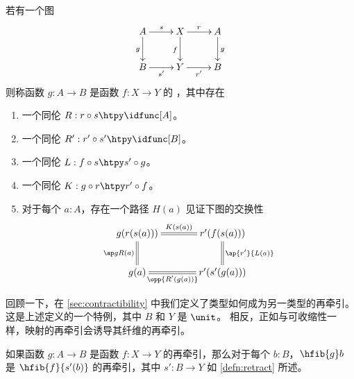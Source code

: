 \begin{defn}\label{defn:retract}
若有一个图
\begin{equation*}
  \xymatrix{
      {A} \ar[r]^{s} \ar[d]_{g}
    &
      {X} \ar[r]^{r} \ar[d]_{f}
    &
      {A} \ar[d]^{g}
    \\
    {B} \ar[r]_{s'}
    &
      {Y} \ar[r]_{r'}
    &
      {B}
  }
\end{equation*}
则称函数 $g:A\to B$ 是函数 $f:X\to Y$ 的 ，其中存在
\begin{enumerate}
  \item 一个同伦 $R:r\circ s \htpy \idfunc[A]$。
  \item 一个同伦 $R':r'\circ s' \htpy\idfunc[B]$。
  \item 一个同伦 $L:f\circ s\htpy s'\circ g$。
  \item 一个同伦 $K:g\circ r\htpy r'\circ f$。
  \item 对于每个 $a:A$，存在一个路径 $H(a)$ 见证下图的交换性
  \begin{equation*}
    \xymatrix@C=3pc{
        {g(r(s(a)))} \ar@{=}[r]^-{K(s(a))} \ar@{=}[d]_{\ap g{R(a)}}
      &
        {r'(f(s(a)))} \ar@{=}[d]^{\ap{r'}{L(a)}}
      \\
      {g(a)} \ar@{=}[r]_-{\opp{R'(g(a))}}
      &
        {r'(s'(g(a)))}
    }
  \end{equation*}
\end{enumerate}
\end{defn}

回顾一下，在 \cref{sec:contractibility} 中我们定义了类型如何成为另一类型的再牵引。
这是上述定义的一个特例，其中 $B$ 和 $Y$ 是 $\unit$。
相反，正如与可收缩性一样，映射的再牵引会诱导其纤维的再牵引。

\begin{lem}\label{lem:func_retract_to_fiber_retract}
如果函数 $g:A\to B$ 是函数 $f:X\to Y$ 的再牵引，那么对于每个 $b:B$，$\hfib{g}b$ 是 $\hfib{f}{s'(b)}$ 的再牵引，其中 $s':B\to Y$ 如 \cref{defn:retract} 所述。
\end{lem}

